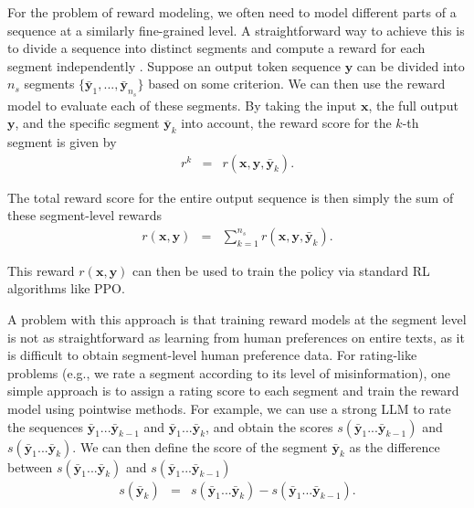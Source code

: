 For the problem of reward modeling, we often need to model different parts of a sequence at a similarly fine-grained level. A straightforward way to achieve this is to divide a sequence into distinct segments and compute a reward for each segment independently \cite{wu-etal:2023finegrained}. Suppose an output token sequence $\mathbf{y}$ can be divided into $n_s$ segments $\{\bar{\mathbf{y}}_1,...,\bar{\mathbf{y}}_{n_s}\}$ based on some criterion. We can then use the reward model to evaluate each of these segments. By taking the input $\mathbf{x}$, the full output $\mathbf{y}$, and the specific segment $\bar{\mathbf{y}}_k$ into account, the reward score for the $k$-th segment is given by
\begin{eqnarray}
r^k & = & r(\mathbf{x}, \mathbf{y}, \bar{\mathbf{y}}_k).
\end{eqnarray}

\noindent The total reward score for the entire output sequence is then simply the sum of these segment-level rewards
\begin{eqnarray}
r(\mathbf{x},\mathbf{y}) & = & \sum_{k=1}^{n_s} r(\mathbf{x}, \mathbf{y}, \bar{\mathbf{y}}_k).
\end{eqnarray}

\noindent This reward  $r(\mathbf{x},\mathbf{y})$ can then be used to train the policy via standard RL algorithms like PPO.

A problem with this approach is that training reward models at the segment level is not as straightforward as learning from human preferences on entire texts, as it is difficult to obtain segment-level human preference data. For rating-like problems (e.g., we rate a segment according to its level of misinformation), one simple approach is to assign a rating score to each segment and train the reward model using pointwise methods. For example, we can use a strong LLM to rate the sequences $\bar{\mathbf{y}}_1...\bar{\mathbf{y}}_{k-1}$ and $\bar{\mathbf{y}}_1...\bar{\mathbf{y}}_k$, and obtain the scores $s(\bar{\mathbf{y}}_1...\bar{\mathbf{y}}_{k-1})$ and $s(\bar{\mathbf{y}}_1...\bar{\mathbf{y}}_k)$. We can then define the score of the segment $\bar{\mathbf{y}}_{k}$ as the difference between $s(\bar{\mathbf{y}}_1...\bar{\mathbf{y}}_k)$ and $s(\bar{\mathbf{y}}_1...\bar{\mathbf{y}}_{k-1})$
\begin{eqnarray}
s(\bar{\mathbf{y}}_k) & = &s(\bar{\mathbf{y}}_1...\bar{\mathbf{y}}_k) - s(\bar{\mathbf{y}}_1...\bar{\mathbf{y}}_{k-1}).
\end{eqnarray}


